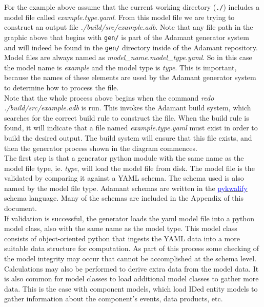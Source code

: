 For the example above assume that the current working directory (\texttt{./}) includes a model file called \textit{example.type.yaml}. From this model file we are trying to construct an output file \textit{./build/src/example.adb}. Note that any file path in the graphic above that begins with \texttt{gen/} is part of the Adamant generator system and will indeed be found in the \texttt{gen/} directory inside of the Adamant repository. \\

Model files are always named as \textit{model\_name.model\_type.yaml}. So in this case the model name is \textit{example} and the model type is \textit{type}. This is important, because the names of these elements are used by the Adamant generator system to determine how to process the file. \\

Note that the whole process above begins when the command \textit{redo ./build/src/example.adb} is run. This invokes the Adamant build system, which searches for the correct build rule to construct the file. When the build rule is found, it will indicate that a file named \textit{example.type.yaml} must exist in order to build the desired output. The build system will ensure that this file exists, and then the generator process shown in the diagram commences. \\

The first step is that a generator python module with the same name as the model file type, ie. \textit{type}, will load the model file from disk. The model file is the validated by comparing it against a YAML schema. The schema used is also named by the model file type. Adamant schemas are written in the \href{https://pykwalify.readthedocs.io/en/unstable/}{\textcolor{blue}{pykwalify}} schema language. Many of the schemas are included in the Appendix of this document. \\

If validation is successful, the generator loads the yaml model file into a python model class, also with the same name as the model type. This model class consists of object-oriented python that ingests the YAML data into a more suitable data structure for computation. As part of this process some checking of the model integrity may occur that cannot be accomplished at the schema level. Calculations may also be performed to derive extra data from the model data. It is also common for model classes to load additional model classes to gather more data. This is the case with component models, which load IDed entity models to gather information about the component's events, data products, etc. \\

